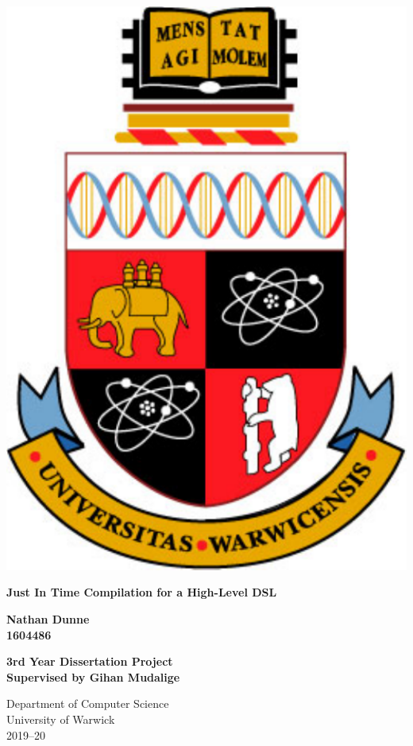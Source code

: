 
\thispagestyle{empty}

\begin{spacing}{2}
	\begin{center}
		\includegraphics[scale = 0.45]{Preamble/WarwickCrest.pdf}
	\end{center}
	\vspace{5mm}
	\begin{center}
		\textbf{\LARGE Just In Time Compilation for a High-Level DSL}
		\vspace{5mm}
	\end{center}
	\begin{center}
		\textbf{\Large Nathan Dunne}\\
		\textbf{\large 1604486}
		\vspace{20mm}
	\end{center}
	\begin{center}
		\textbf{\Large 3rd Year Dissertation Project}\\
		\textbf{\large Supervised by Gihan Mudalige}\\
		\vspace{20mm}
	\end{center}
	\begin{center}
		{\large Department of Computer Science}\\
		{\large University of Warwick}\\
		{\large 2019--20}
	\end{center}
\end{spacing}


